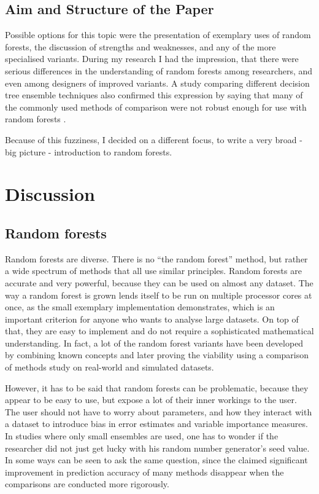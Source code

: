 \documentclass[a4paper,man,12pt,apacite,floatsintext,draftfirst]{apa6} %
\begin{document}
\subsection{Aim and Structure of the Paper}
Possible options for this topic were the presentation of
exemplary uses of random
forests, the discussion of strengths and weaknesses, and any of the more
specialised variants.
During my research I had the impression, that there were serious
differences in the understanding of random forests among researchers,
and even among designers of improved variants.
A study comparing different decision tree ensemble techniques also confirmed
this expression by saying that many of the commonly used methods of comparison
were not robust enough for use with random forests \cite{banfield2007comparison}.

Because of this fuzziness, I decided on a different focus, to write
a very broad - big picture - introduction to random forests.

\newpage
\section{Discussion}
\subsection{Random forests}
Random forests are diverse.
There is no “the random forest” method, but rather a wide spectrum of
methods that all use similar principles.
Random forests are accurate and very powerful, because they can be used
on almost any dataset.
The way a random forest is grown lends itself to be run on multiple processor 
cores at once, as the
small exemplary implementation demonstrates, which is an important criterion
for anyone who wants to analyse large datasets.
On top of that, they are easy to implement and do not require a sophisticated
mathematical understanding.
In fact, a lot of the random forest variants have been developed by combining
known concepts and later proving the viability using  a comparison of methods
study on real-world and simulated datasets.

However, it has to be said that random forests can be problematic,
because they appear to be easy to use, but expose a lot of their
inner workings to the user.
The user should not have to worry about parameters, and how they interact
with a dataset to introduce bias in error estimates and
variable importance measures.
In studies where only small ensembles are used, one has to wonder if the
researcher did not just get lucky with his random number generator's seed value.
In some ways  can be seen to ask the same question,
since the claimed significant improvement in prediction accuracy of many methods
disappear when the comparisons are conducted more rigorously.
\end{document}
